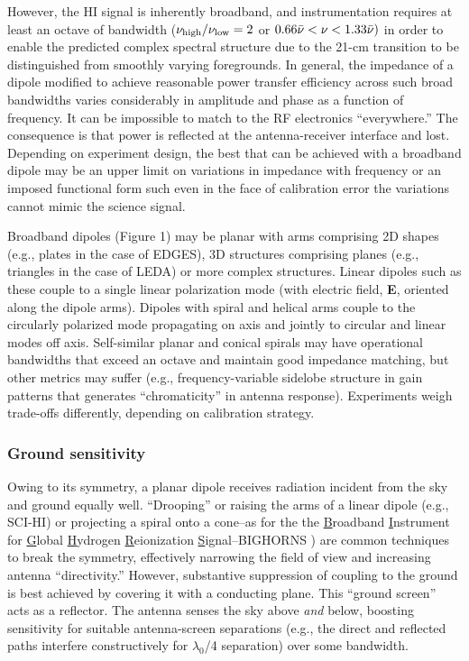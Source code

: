 However, the HI signal is inherently broadband, and instrumentation requires at least an octave of bandwidth ($\nu_{\rm high}/\nu_{\rm low}=2$ or $0.66\Bar{\nu}<\nu<1.33\Bar{\nu})$ in order to enable the predicted complex spectral structure due to the 21-cm transition to be distinguished from  smoothly varying foregrounds.  In general, the impedance of a dipole modified to achieve reasonable power transfer efficiency across such broad bandwidths varies considerably in amplitude and phase as a function of frequency.   It can be impossible to match to the RF electronics ``everywhere.''  The consequence is that power is reflected at the antenna-receiver interface and lost. Depending on experiment design, the best that can be achieved with a broadband dipole may be an upper limit on variations in impedance with frequency or an imposed functional form such even in the face of calibration error the variations cannot mimic the science signal.

Broadband dipoles (Figure 1) may be planar with arms comprising 2D shapes (e.g., plates in the case of EDGES), 3D structures comprising planes  (e.g., triangles in the case of LEDA) or more complex structures.  Linear dipoles such as these couple to a single linear polarization mode (with electric field, {\bf E}, oriented along the dipole arms).  Dipoles with spiral and helical arms couple to the circularly polarized mode propagating on axis and jointly to circular and linear modes off axis.  Self-similar planar and conical spirals may have operational bandwidths that exceed an octave and maintain good impedance matching, but other metrics may suffer (e.g., frequency-variable sidelobe structure in gain patterns that generates ``chromaticity'' in antenna response).  Experiments weigh trade-offs differently, depending on calibration strategy.

\subsubsection{Ground sensitivity}

Owing to its symmetry, a planar dipole receives radiation incident from the sky and ground equally well.  ``Drooping'' or raising the arms of a linear dipole (e.g., SCI-HI) or projecting a spiral onto a cone--as for the the {\underline B}roadband {\underline I}nstrument for {\underline G}lobal {\underline H}ydrogen {\underline R}eionization {\underline S}ignal--BIGHORNS \cite{sokolowski15}
) are common techniques to break the symmetry, effectively narrowing the field of view and increasing antenna ``directivity.''  However, substantive suppression of coupling to the ground is best achieved by covering it with  a conducting plane.  This ``ground screen'' acts as a reflector.  The antenna senses the sky above {\it and} below, boosting sensitivity for suitable antenna-screen separations (e.g., the direct and reflected paths interfere constructively for $\lambda_0$/4 separation) over some bandwidth. 

